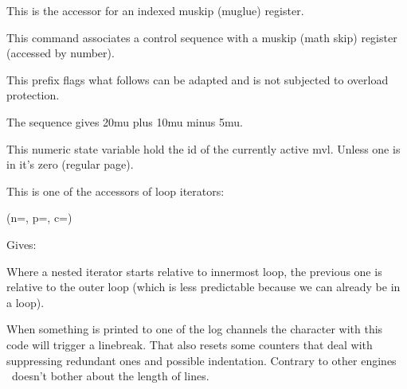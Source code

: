 \stopnewprimitive

\startoldprimitive[title={\prm {muskip}}]

This is the accessor for an indexed muskip (muglue) register.

\stopoldprimitive

\startoldprimitive[title={\prm {muskipdef}}]

This command associates a control sequence with a muskip (math skip) register
(accessed by number).

\stopoldprimitive

\startnewprimitive[title={\prm {mutable}}]

This prefix flags what follows can be adapted and is not subjected to overload
protection.

\stopnewprimitive

\startoldprimitive[title={\prm {mutoglue}}]

The sequence  gives \the \mutoglue
20mu plus 10mu minus 5mu.

\stopoldprimitive

\startnewprimitive[title={\prm {mvlcurrentlyactive}}]

This numeric state variable hold the id of the currently active mvl. Unless one
is in  it's zero (regular page).

\stopnewprimitive

\startnewprimitive[title={\prm {nestedloopiterator}}]

This is one of the accessors of loop iterators:

\startbuffer
{} {%
     {%
        (n=\the{},
         p=\the{},
         c=\the\currentloopiterator)
    }%
}%
\stopbuffer

\typebuffer

Gives:

\getbuffer

Where a nested iterator starts relative to innermost loop, the previous one is
relative to the outer loop (which is less predictable because we can already be
in a loop).

\stopnewprimitive

\startoldprimitive[title={\prm {newlinechar}}]

When something is printed to one of the log channels the character with this code
will trigger a linebreak. That also resets some counters that deal with
suppressing redundant ones and possible indentation. Contrary to other engines
\LUAMETATEX\ doesn't bother about the length of lines.

